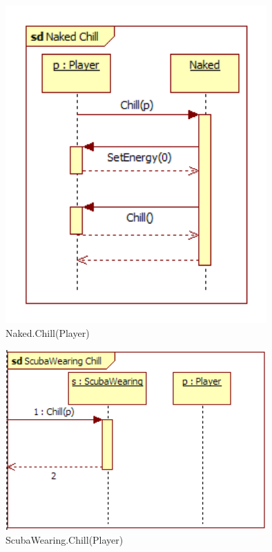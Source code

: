 \begin{figure}[H]
	\begin{center}
		\includegraphics[width=10cm]{chapters/chapter04/seqdiag/Naked_Chill.png}
		\caption{Naked.Chill(Player)}
		\label{fig:NakedChill}
	\end{center}
\end{figure}
\begin{figure}[H]
	\begin{center}
		\includegraphics[width=10cm]{chapters/chapter04/seqdiag/ScubaWearing_Chill.png}
		\caption{ScubaWearing.Chill(Player)}
		\label{fig:ScubaWearingChill}
	\end{center}
\end{figure}

